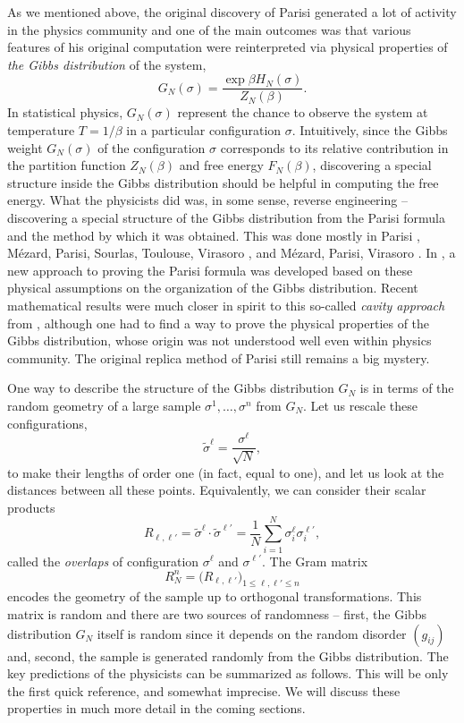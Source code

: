 \documentclass[12pt]{article}
\theoremstyle{nonumberplain}
\begin{document}
As we mentioned above, the original discovery of Parisi generated a lot of activity in the physics community and one of the main outcomes was that various features of his original computation were reinterpreted via physical properties of \emph{the Gibbs distribution} of the system,
\begin{equation}
G_N(\sigma) = \frac{\exp \beta H_N(\sigma)}{Z_N(\beta)}.
\end{equation}
In statistical physics, $G_N(\sigma)$ represent the chance to observe the system at temperature $T=1/\beta$ in a particular configuration $\sigma$. Intuitively, since the Gibbs weight $G_N(\sigma)$ of the configuration $\sigma$ corresponds to its relative contribution in the partition function $Z_N(\beta)$ and free energy $F_N(\beta)$, discovering a special structure inside the Gibbs distribution should be helpful in computing the free energy. What the physicists did was, in some sense, reverse engineering -- discovering a special structure of the Gibbs distribution from the Parisi formula and the method by which it was obtained. This was done mostly in Parisi \cite{Parisi83}, M\'ezard, Parisi, Sourlas, Toulouse, Virasoro \cite{M1, M2}, and M\'ezard, Parisi, Virasoro \cite{MPV0,MPV1}. In \cite{MPV1}, a new approach to proving the Parisi formula was developed based on these physical assumptions on the organization of the Gibbs distribution. Recent mathematical results were much closer in spirit to this so-called \emph{cavity approach} from \cite{MPV1}, although one had to find a way to prove the physical properties of the Gibbs distribution, whose origin was not understood well even within physics community. The original replica method of Parisi still remains a big mystery.  


One way to describe the structure of the Gibbs distribution $G_N$ is in terms of the random geometry of a large sample $\sigma^1,\ldots,\sigma^n$ from $G_N.$ Let us rescale these configurations, 
$$
\tilde{\sigma}^\ell = \frac{\sigma^\ell}{\sqrt{N}},
$$ 
to make their lengths of order one (in fact, equal to one), and let us look at the distances between all these points. Equivalently, we can consider their scalar products
\begin{equation}
R_{\ell,\ell'} =\tilde{\sigma}^\ell \cdot \tilde{\sigma}^{\ell'} 
=\frac{1}{N} \sum_{i=1}^N \sigma_i^\ell  \sigma_i^{\ell'}, 
\label{overlap}
\end{equation}
called the \emph{overlaps} of configuration $\sigma^\ell$ and $\sigma^{\ell'}$. The Gram matrix 
$$
R_N^n = \bigl(R_{\ell,\ell'}\bigr)_{1\leq \ell,\ell'\leq n}
$$ 
encodes the geometry of the sample up to orthogonal transformations. This matrix is random and there are two sources of randomness -- first, the Gibbs distribution $G_N$ itself is random since it depends on the random disorder $(g_{ij})$ and, second, the sample is generated randomly from the Gibbs distribution. The key predictions of the physicists can be summarized as follows. This will be only the first quick reference, and somewhat imprecise. We will discuss these properties in much more detail in the coming sections.  
\end{document}
